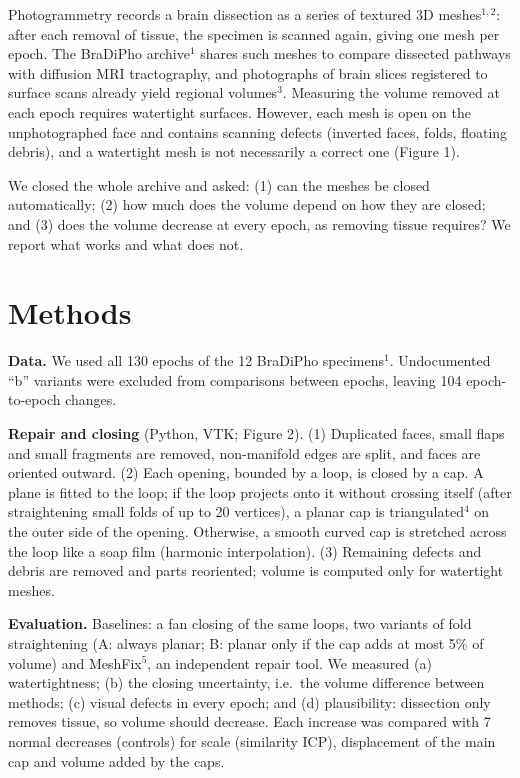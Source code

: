 \documentclass[11pt]{article}
\begin{document}
Photogrammetry records a brain dissection as a series of textured 3D
meshes$^{1,2}$: after each removal of tissue, the specimen is scanned again,
giving one mesh per epoch. The BraDiPho archive$^{1}$ shares such meshes to
compare dissected pathways with diffusion MRI tractography, and photographs
of brain slices registered to surface scans already yield regional
volumes$^{3}$. Measuring the volume removed at each epoch requires watertight
surfaces. However, each mesh is open on the unphotographed face and contains scanning defects (inverted faces, folds, floating debris), and a
watertight mesh is not necessarily a correct one (Figure 1).

We closed the whole archive and asked: (1) can the meshes be closed
automatically; (2) how much does the volume depend on how they are closed;
and (3) does the volume decrease at every epoch, as removing tissue
requires? We report what works and what does not.

\section*{Methods}

\textbf{Data.} We used all 130 epochs of the 12 BraDiPho specimens$^{1}$. Undocumented ``b'' variants were excluded from
comparisons between epochs, leaving 104 epoch-to-epoch changes.

\textbf{Repair and closing} (Python, VTK; Figure 2). (1) Duplicated faces,
small flaps and small fragments are removed, non-manifold edges are split,
and faces are oriented outward. (2) Each opening, bounded by a loop, is
closed by a cap. A plane is fitted to the loop; if the loop projects onto it
without crossing itself (after straightening small folds of up to 20
vertices), a planar cap is triangulated$^{4}$ on the outer side of the
opening. Otherwise, a smooth curved cap is stretched across the loop like a
soap film (harmonic interpolation).
(3) Remaining defects and debris are removed and parts reoriented; volume
is computed only for watertight meshes.

\textbf{Evaluation.} Baselines: a fan closing of the same loops, two
variants of fold straightening (A: always planar; B: planar only if the cap
adds at most 5\% of volume) and MeshFix$^{5}$, an independent repair
tool. We measured (a) watertightness; (b) the closing
uncertainty, i.e.\ the volume difference between methods; (c) visual defects
in every epoch; and (d) plausibility: dissection only removes tissue, so
volume should decrease. Each increase was compared with 7 normal decreases
(controls) for scale (similarity ICP), displacement of
the main cap and volume added by the caps.
\end{document}
